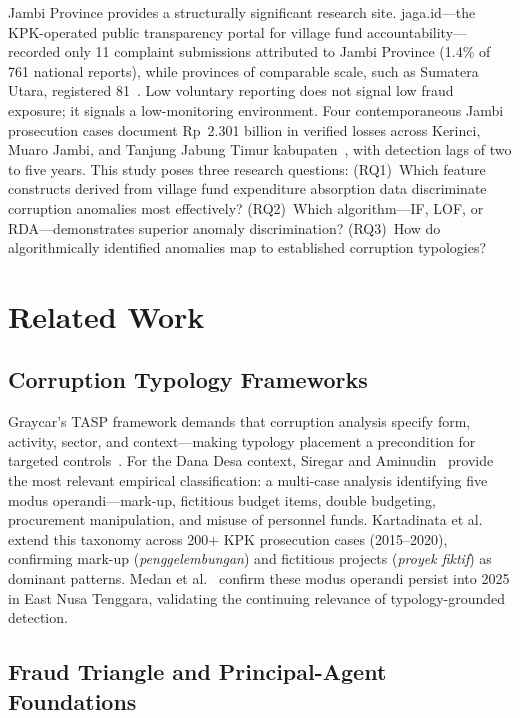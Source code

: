\documentclass[3p,times,procedia]{elsarticle}
\begin{document}
Jambi Province provides a structurally significant research site. jaga.id---the KPK-operated public transparency portal for village fund accountability---recorded only 11 complaint submissions attributed to Jambi Province (1.4\% of 761 national reports), while provinces of comparable scale, such as Sumatera Utara, registered 81~\cite{ref27}. Low voluntary reporting does not signal low fraud exposure; it signals a low-monitoring environment. Four contemporaneous Jambi prosecution cases document Rp~2.301 billion in verified losses across Kerinci, Muaro Jambi, and Tanjung Jabung Timur kabupaten~\cite{ref30,ref31,ref32,ref33}, with detection lags of two to five years. This study poses three research questions: (RQ1)~Which feature constructs derived from village fund expenditure absorption data discriminate corruption anomalies most effectively? (RQ2)~Which algorithm---IF, LOF, or RDA---demonstrates superior anomaly discrimination? (RQ3)~How do algorithmically identified anomalies map to established corruption typologies?

\section{Related Work}
\label{sec:related}

\subsection{Corruption Typology Frameworks}

Graycar's TASP framework demands that corruption analysis specify form, activity, sector, and context---making typology placement a precondition for targeted controls~\cite{ref7}. For the Dana Desa context, Siregar and Aminudin~\cite{ref13} provide the most relevant empirical classification: a multi-case analysis identifying five modus operandi---mark-up, fictitious budget items, double budgeting, procurement manipulation, and misuse of personnel funds. Kartadinata et al.~\cite{ref14} extend this taxonomy across 200+ KPK prosecution cases (2015--2020), confirming mark-up (\textit{penggelembungan}) and fictitious projects (\textit{proyek fiktif}) as dominant patterns. Medan et al.~\cite{ref15} confirm these modus operandi persist into 2025 in East Nusa Tenggara, validating the continuing relevance of typology-grounded detection.

\subsection{Fraud Triangle and Principal-Agent Foundations}
\end{document}
